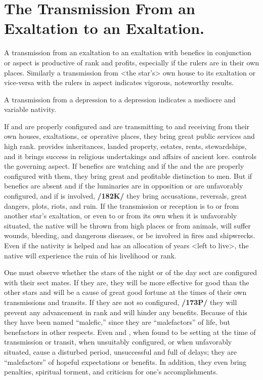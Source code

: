 \section{The Transmission From an Exaltation to an Exaltation.}

A transmission from an exaltation to an exaltation with benefics in conjunction or aspect is productive of rank and profits, especially if the rulers are in their own places. Similarly a transmission from <the star’s> own house to its exaltation or vice-versa with the rulers in aspect indicates vigorous, noteworthy results. 

A transmission from a depression to a depression indicates a mediocre and variable nativity.

If \Saturn\xspace and \Mars\xspace are properly configured and are transmitting to and receiving from their own houses,
exaltations, or operative places, they bring great public services and high rank. \Saturn\xspace provides inheritances, landed property, estates, rents, stewardships, and it brings success in religious undertakings and affairs of ancient lore. \Mars\xspace controls the governing aspect. If benefics are watching and if the \Sun\xspace and the \Moon\xspace are properly configured with them, they bring great and profitable distinction to men. But if benefics are absent and if the luminaries are in opposition or are unfavorably configured, and if \Mercury\xspace is involved, \textbf{/182K/} they bring accusations, reversals, great dangers, plots, riots, and ruin.
If the transmission or reception is to or from another star’s exaltation, or even to or from its own when it is unfavorably
situated, the native will be thrown from high places or from animals, will suffer wounds, bleeding, and dangerous diseases, or be involved in fires and shipwrecks. Even if the nativity is helped and has an allocation of years <left to live>, the native will experience the ruin of his livelihood or rank.

One must observe whether the stars of the night or of the day sect are configured with their sect mates. If they are, they will be more effective for good than the other stars and will be a cause of great good fortune at the times of their own transmissions and transits. If they are not so configured, \textbf{/173P/} they will prevent any advancement in rank and will hinder any benefits. Because of this they have been named “malefic,” since they are “malefactors” of life, but benefactors in other respects. Even \Jupiter\xspace and \Venus, when found to be setting at the time of transmission or transit, when unsuitably configured, or when unfavorably
situated, cause a disturbed period, unsuccessful and full of delays; they are “malefactors” of hopeful expectations or benefits. In addition, they even bring penalties, spiritual torment, and criticism for one’s accomplishments.

\newpage